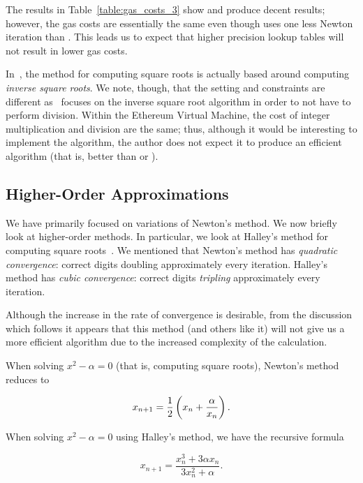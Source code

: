 The results in Table~\ref{table:gas_costs_3}
show \LookupFour{} and \LookupEight{} produce decent results;
however, the gas costs are essentially the same even though \LookupEight{}
uses one less Newton iteration than \LookupFour{}.
This leads us to expect that higher precision
lookup tables will not result in lower gas costs.

In~\cite{FormalVerIsqrt}, the method for computing
square roots is actually based around computing \emph{inverse square roots}.
We note, though, that the setting and constraints are different
as~\cite{FormalVerIsqrt} focuses on the inverse square root algorithm
in order to not have to perform division.
Within the Ethereum Virtual Machine,
the cost of integer multiplication and division are the same;
thus, although it would be interesting to implement the algorithm,
the author does not expect it to produce an efficient algorithm
(that is, better than \UnrolledThree{} or \Linear{}).

\subsection{Higher-Order Approximations}
\label{app:higher-order}

We have primarily focused on variations of Newton's method.
We now briefly look at higher-order methods.
In particular, we look at Halley's method
for computing square roots~\cite[Section 2]{guo2010newton}.
We mentioned that Newton's method has \emph{quadratic convergence}:
correct digits doubling approximately every iteration.
Halley's method has \emph{cubic convergence}:
correct digits \emph{tripling} approximately every iteration.

Although the increase in the rate of convergence is desirable,
from the discussion which follows it appears that this method
(and others like it)
will not give us a more efficient algorithm due to the increased complexity
of the calculation.

When solving $x^{2} - \alpha = 0$ (that is, computing square roots),
Newton's method reduces to

\begin{equation}
    x_{n+1} = \frac{1}{2}\left( x_{n} + \frac{\alpha}{x_{n}} \right).
\end{equation}

\noindent
When solving $x^{2} - \alpha = 0$ using Halley's method,
we have the recursive formula

\begin{equation}
    x_{n+1} = \frac{x_{n}^{3} + 3\alpha x_{n}}{3x_{n}^{2} + \alpha}.
    \label{eq:halley_iteration}
\end{equation}

